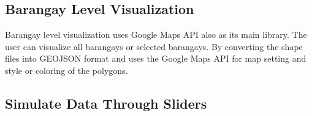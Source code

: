 \subsection{Barangay Level Visualization}
Barangay level visualization uses Google Maps API also as its main library. The user can visualize all barangays or selected barangays. By converting the shape files into GEOJSON format and uses the Google Maps API for map setting and style or coloring of the polygons. 
\subsection{Simulate Data Through Sliders}


\clearpage